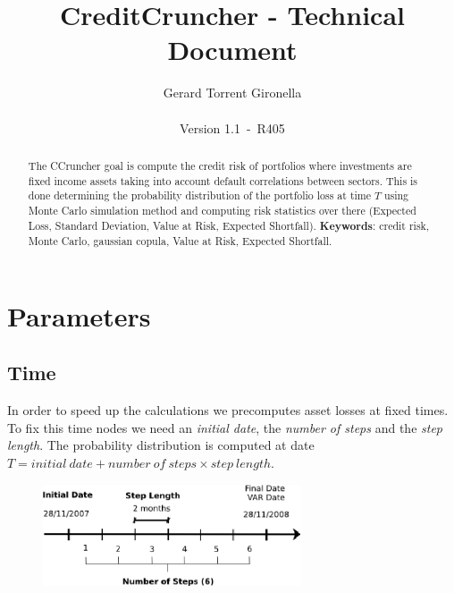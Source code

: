 \documentclass[a4paper,12pt,final]{article}
\def\numversion{1.1}
\def\svnversion{R405}
\begin{document}
\title{CreditCruncher - Technical Document}
\author{Gerard Torrent Gironella\\\\Version \numversion\ -\ \svnversion}
\date{}
\maketitle


\begin{abstract}
The CCruncher goal is compute the credit risk of portfolios where 
investments are fixed income assets taking into account default correlations
between sectors. This is done determining the probability distribution of the 
portfolio loss at time $T$ using Monte Carlo simulation method and computing 
risk statistics over there (Expected Loss, Standard Deviation, Value at Risk,
Expected Shortfall).
\newline
\newline
\textbf{Keywords}: credit risk, Monte Carlo, gaussian copula, Value at Risk,
Expected Shortfall.
\end{abstract}


\section{Parameters}

\subsection{Time}
In order to speed up the calculations we precomputes asset losses at fixed 
times. To fix this time nodes we need an \emph{initial date}, the 
\emph{number of steps} and the \emph{step length}. The probability distribution
is computed at date $T = initial\ date + number\ of\ steps \times step\ length$.

\begin{figure}[!hb]
\begin{center}
\includegraphics[height=3.0cm, angle=0]{./images/cctime1.eps}
\label{cctime1}
\end{center}
\end{figure}
\end{document}
